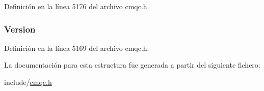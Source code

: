 Definición en la línea 5176 del archivo cmqc.\+h.

\hypertarget{structtag_m_q_t_m_a0656ef8f766b3907d394d88a35d7b7e9}{}
\subsubsection[{Version}]{ Version}\label{structtag_m_q_t_m_a0656ef8f766b3907d394d88a35d7b7e9}


Definición en la línea 5169 del archivo cmqc.\+h.



La documentación para esta estructura fue generada a partir del siguiente fichero\+:\begin{DoxyCompactItemize}
\item 
include/\hyperlink{cmqc_8h}{cmqc.\+h}\end{DoxyCompactItemize}
